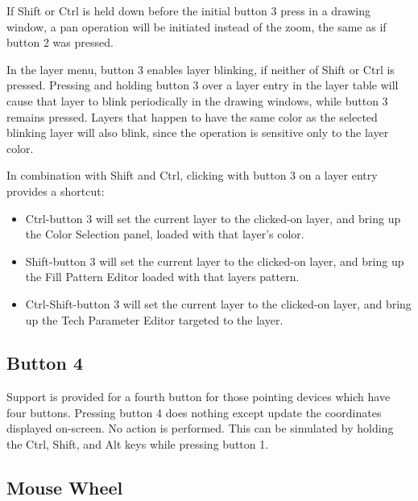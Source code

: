 If {\kb Shift} or {\kb Ctrl} is held down before the initial button 3
press in a drawing window, a pan operation will be initiated instead
of the zoom, the same as if button 2 was pressed.

In the layer menu, button 3 enables layer blinking, if neither of {\kb
Shift} or {\cb Ctrl} is pressed.  Pressing and holding button 3 over a
layer entry in the layer table will cause that layer to blink
periodically in the drawing windows, while button 3 remains pressed. 
Layers that happen to have the same color as the selected blinking
layer will also blink, since the operation is sensitive only to the
layer color.

In combination with {\kb Shift} and {\kb Ctrl}, clicking with button 3
on a layer entry provides a shortcut:

\begin{itemize}
\item{{\kb Ctrl}-button 3 will set the current layer to the clicked-on
layer, and bring up the {\cb Color Selection} panel, loaded with that
layer's color.}

\item{{\kb Shift}-button 3 will set the current layer to the
clicked-on layer, and bring up the {\cb Fill Pattern Editor} loaded
with that layers pattern.}

\item{{\kb Ctrl-Shift}-button 3 will set the current layer to the
clicked-on layer, and bring up the {\cb Tech Parameter Editor}
targeted to the layer.}
\end{itemize}


\subsection{Button 4}

Support is provided for a fourth button for those pointing devices
which have four buttons.  Pressing button 4 does nothing except update
the coordinates displayed on-screen.  No action is performed.  This
can be simulated by holding the {\kb Ctrl}, {\kb Shift}, and {\kb Alt}
keys while pressing button 1.


\subsection{Mouse Wheel}

